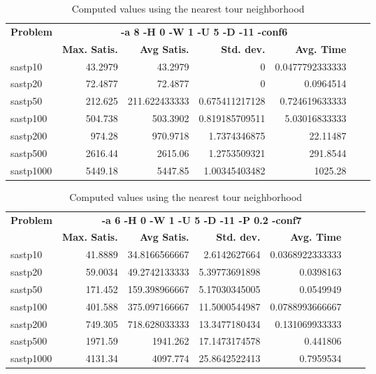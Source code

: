 \documentclass{article}
\begin{document}
\begin{table}[b!]
  \vspace{-6mm}%
  \caption{Computed values using the nearest tour neighborhood}
  \label{tab:NearestTour}
  \setlength{\tabcolsep}{1.4mm}
  \centering
  \begin{tabular}{lrrrrrr}
   \multirow{2}{*}{\bfseries Problem} &
      \multicolumn{4}{c}{\bfseries -a 8 -H 0 -W 1 -U 5 -D -11 -conf6 } \\
    &
    \bfseries Max. Satis. &
    \bfseries Avg Satis. &
    \bfseries Std. dev. &
    \bfseries Avg. Time 
    \\\hline
sastp10 & 43.2979 & 43.2979 & 0 & 0.0477792333333 \\ 
sastp20 & 72.4877 & 72.4877 & 0 & 0.0964514 \\ 
sastp50 & 212.625 & 211.622433333 & 0.675411217128 & 0.724619633333 \\ 
sastp100 & 504.738 & 503.3902 & 0.819185709511 & 5.03016833333 \\ 
sastp200 & 974.28 & 970.9718 & 1.7374346875 & 22.11487 \\ 
sastp500 & 2616.44 & 2615.06 & 1.2753509321 & 291.8544 \\ 
sastp1000 & 5449.18 & 5447.85 & 1.00345403482 & 1025.28

    \\\hline
  \end{tabular}

\end{table}

\begin{table}[b!]
  \vspace{-6mm}%
  \caption{Computed values using the nearest tour neighborhood}
  \label{tab:NearestTour}
  \setlength{\tabcolsep}{1.4mm}
  \centering
  \begin{tabular}{lrrrrrr}
   \multirow{2}{*}{\bfseries Problem} &
      \multicolumn{4}{c}{\bfseries -a 6 -H 0 -W 1 -U 5 -D -11 -P 0.2 -conf7 } \\
    &
    \bfseries Max. Satis. &
    \bfseries Avg Satis. &
    \bfseries Std. dev. &
    \bfseries Avg. Time 
    \\\hline
   sastp10 & 41.8889 & 34.8166566667 & 2.6142627664 & 0.0368922333333 \\ 
sastp20 & 59.0034 & 49.2742133333 & 5.39773691898 & 0.0398163 \\ 
sastp50 & 171.452 & 159.398966667 & 5.17030345005 & 0.0549949 \\ 
sastp100 & 401.588 & 375.097166667 & 11.5000544987 & 0.0788993666667 \\ 
sastp200 & 749.305 & 718.628033333 & 13.3477180434 & 0.131069933333 \\ 
sastp500 & 1971.59 & 1941.262 & 17.1473174578 & 0.441806 \\ 
sastp1000 & 4131.34 & 4097.774 & 25.8642522413 & 0.7959534

    \\\hline
  \end{tabular}

\end{table}
\end{document}
